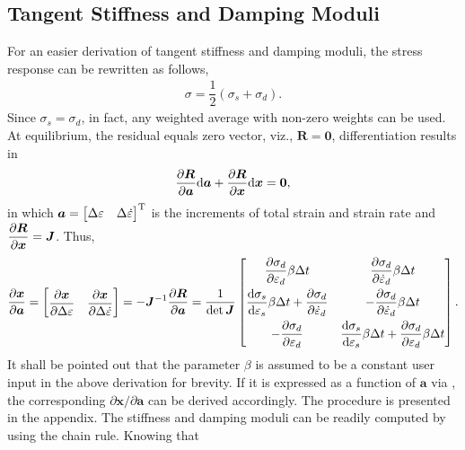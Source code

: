 \subsection{Tangent Stiffness and Damping Moduli}
For an easier derivation of tangent stiffness and damping moduli, the stress response can be rewritten as follows,
\begin{gather}
\sigma=\dfrac{1}{2}\left(\sigma_s+\sigma_d\right).
\end{gather}
Since $\sigma_s=\sigma_d$, in fact, any weighted average with non-zero weights can be used. At equilibrium, the residual equals zero vector, viz., $\mathbold{R}=\mathbold{0}$, differentiation results in
\begin{gather}
\dfrac{\partial\bm{R}}{\partial\bm{a}}\mathrm{d}\bm{a}+\dfrac{\partial\bm{R}}{\partial\bm{x}}\mathrm{d}\bm{x}=\bm{0},
\end{gather}
in which $\bm{a}=\begin{bmatrix}
\Delta\varepsilon&\Delta\dot\varepsilon
\end{bmatrix}^{\mathrm{T}}$ is the increments of total strain and strain rate and $\dfrac{\partial\bm{R}}{\partial\bm{x}}=\bm{J}$. Thus,
\begin{gather}\label{eq:internal}
\dfrac{\partial\bm{x}}{\partial\bm{a}}=\begin{bmatrix}\dfrac{\partial\bm{x}}{\partial\Delta\varepsilon}&\dfrac{\partial\bm{x}}{\partial\Delta\dot\varepsilon}\end{bmatrix}=-\bm{J}^{-1}\dfrac{\partial\bm{R}}{\partial\bm{a}}=\dfrac{1}{\det{\bm{J}}}\begin{bmatrix}
	\dfrac{\partial\sigma_d}{\partial\varepsilon_d}\beta\Delta{}t                                               & \dfrac{\partial\sigma_d}{\partial\dot\varepsilon_d}\beta\Delta{}t                                                     \\[3mm]
	\dfrac{\mathrm{d}\sigma_s}{\mathrm{d}\varepsilon_s}\beta\Delta{}t+\dfrac{\partial\sigma_d}{\partial\dot\varepsilon_d} & -\dfrac{\partial\sigma_d}{\partial\dot\varepsilon_d}\beta\Delta{}t                                                    \\[3mm]
	-\dfrac{\partial\sigma_d}{\partial\varepsilon_d}                                                            & \dfrac{\mathrm{d}\sigma_s}{\mathrm{d}\varepsilon_s}\beta\Delta{}t+\dfrac{\partial\sigma_d}{\partial\varepsilon_d}\beta\Delta{}t
\end{bmatrix}.
\end{gather}
It shall be pointed out that the parameter $\beta$ is assumed to be a constant user input in the above derivation for brevity. If it is expressed as a function of $\mathbold{a}$ via , the corresponding $\partial\mathbold{x}/\partial\mathbold{a}$ can be derived accordingly. The procedure is presented in the appendix. The stiffness and damping moduli can be readily computed by using the chain rule. Knowing that
